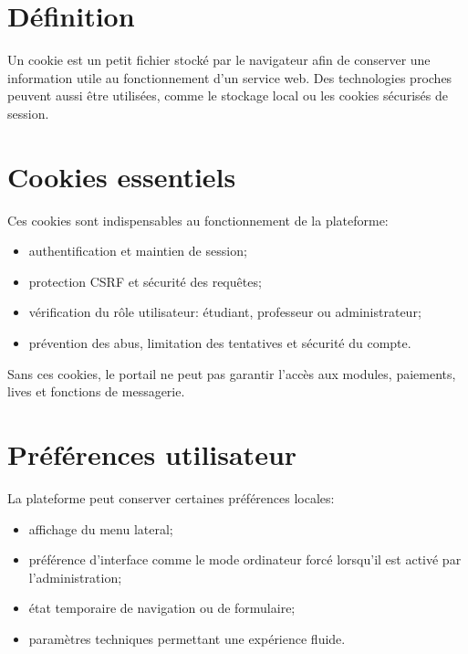 \documentclass[11pt,a4paper]{article}
\begin{document}
\PAMakeCover
{}

\hfill
{}

\hfill
{}

\section{Définition}
Un cookie est un petit fichier stocké par le navigateur afin de conserver une information utile au fonctionnement d'un service web. Des technologies proches peuvent aussi être utilisées, comme le stockage local ou les cookies sécurisés de session.

\section{Cookies essentiels}
Ces cookies sont indispensables au fonctionnement de la plateforme:
\begin{itemize}
  \item authentification et maintien de session;
  \item protection CSRF et sécurité des requêtes;
  \item vérification du rôle utilisateur: étudiant, professeur ou administrateur;
  \item prévention des abus, limitation des tentatives et sécurité du compte.
\end{itemize}
Sans ces cookies, le portail ne peut pas garantir l'accès aux modules, paiements, lives et fonctions de messagerie.

\section{Préférences utilisateur}
La plateforme peut conserver certaines préférences locales:
\begin{itemize}
  \item affichage du menu lateral;
  \item préférence d'interface comme le mode ordinateur forcé lorsqu'il est activé par l'administration;
  \item état temporaire de navigation ou de formulaire;
  \item paramètres techniques permettant une expérience fluide.
\end{itemize}
\end{document}
